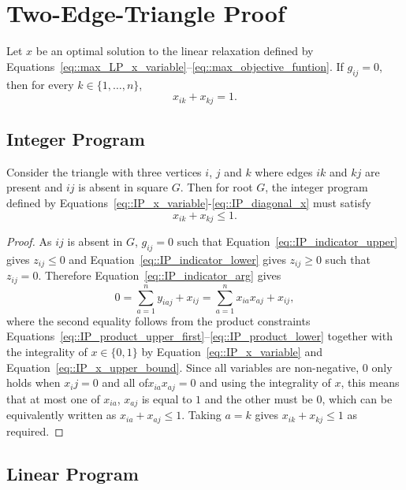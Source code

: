 \section{Two-Edge-Triangle Proof} \label{sec::two_edge_triangle_proof}

Let $x$ be an optimal solution to the linear relaxation defined by Equations~\eqref{eq::max_LP_x_variable}--\eqref{eq::max_objective_funtion}. 
If $g_{ij}=0$, then for every $k\in\{1,\dots,n\}$,
\[
x_{ik}+x_{kj}=1.
\]

\subsection{Integer Program} \label{subsec::triangle_two_edges_integer_program}

\begin{lemma} \label{lemma::two_edges_integer_sum}
  Consider the triangle with three vertices $i$, $j$ and $k$ where edges $ik$ and $kj$ are present and $ij$ is absent in square $G$. Then for root $G$, the integer program defined by Equations~\eqref{eq::IP_x_variable}-\eqref{eq::IP_diagonal_x} must satisfy
  \[
  x_{ik} + x_{kj} \leq 1. 
  \]
\end{lemma}
\begin{proof}
  As $ij$ is absent in $G$, $g_{ij} = 0$ such that Equation~\eqref{eq::IP_indicator_upper} gives $z_{ij} \leq 0$ and Equation~\eqref{eq::IP_indicator_lower} gives $z_{ij} \geq 0$ such that $z_{ij} = 0$. Therefore Equation~\eqref{eq::IP_indicator_arg} gives 
  \[
  0 = \sum_{a=1}^{n}y_{iaj}+x_{ij} = \sum_{a=1}^{n}x_{ia}x_{aj}+x_{ij},
  \]
  where the second equality follows from the product constraints Equations~\eqref{eq::IP_product_upper_first}--\eqref{eq::IP_product_lower} together with the integrality of $x \in \{0, 1\}$ by Equation~\eqref{eq::IP_x_variable} and Equation~\eqref{eq::IP_x_upper_bound}. Since all variables are non-negative, $0$ only holds when $x_ij = 0$ and all of$x_{ia} x_{aj}=0$ and using the integrality of $x$, this means that at most one of $x_{ia}$, $x_{aj}$ is equal to $1$ and the other must be $0$, which can be equivalently written as $x_{ia} + x_{aj} \leq 1$. Taking $a=k$ gives $x_{ik}+x_{kj} \leq 1$ as required. 
\end{proof}

\subsection{Linear Program} \label{subsec::triangle_two_edges_linear_program}

